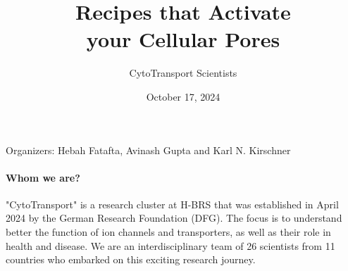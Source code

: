 \documentclass{article}
\author{CytoTransport Scientists}
\title{\textcolor{HBRS}{\Huge\textbf{Recipes that Activate\\your Cellular Pores}}}
\begin{document}
\date{October 17, 2024}
\maketitle


\vfill
\begin{center}
Organizers: Hebah Fatafta, Avinash Gupta and Karl N. Kirschner
\end{center}

\frontmatter

\paragraph{Whom we are?} 

"CytoTransport" is a research cluster at H-BRS that was established in April 2024 by the German Research Foundation (DFG). The focus is to understand better the function of ion channels and transporters, as well as their role in health and disease. We are an interdisciplinary team of 26 scientists from 11 countries who embarked on this exciting research journey.
\end{document}
